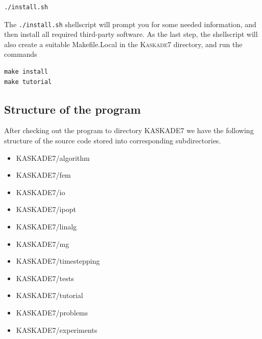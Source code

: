 \documentclass[11pt]{article}
\newcommand{\K}{\textsc{Kaskade7 }}
\begin{document}
\begin{scriptsize} 
\begin{verbatim} 
./install.sh
\end{verbatim} 
\end{scriptsize} 

\noindent The {\tt./install.sh} shellscript will prompt you for some needed information, and then install all required third-party software. As the last step, the shellscript will also create a suitable Makefile.Local in the \K directory, and run the commands 

\begin{scriptsize} 
\begin{verbatim} 
make install 
make tutorial 
\end{verbatim} 
\end{scriptsize} 


\subsection{Structure of the program}
After checking out the program to directory  KASKADE7 we have the following 
structure of the source code stored into corresponding subdirectories.

\begin{itemize}
\item KASKADE7/algorithm
\item KASKADE7/fem
\item KASKADE7/io
\item KASKADE7/ipopt                      %
\item KASKADE7/linalg
\item KASKADE7/mg                         %
\item KASKADE7/timestepping               %
\item KASKADE7/tests
\item KASKADE7/tutorial
\item KASKADE7/problems
\item KASKADE7/experiments
\end{itemize}
\end{document}
